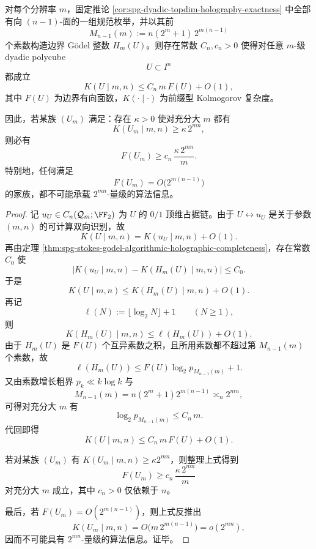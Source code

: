\begin{theorem}\label{thm:conclusion-boundary-kolmogorov-incompressibility-forces-roughness}
对每个分辨率 \(m\)，固定推论 \ref{cor:spg-dyadic-topdim-holography-exactness} 中全部有向 \((n-1)\)-面的一组规范枚举，并以其前
\[
M_{n-1}(m):=n(2^m+1)\,2^{m(n-1)}
\]
个素数构造边界 Gödel 整数 \(H_m(U)\)。则存在常数 \(C_n,c_n>0\) 使得对任意 \(m\)-级 dyadic polycube
\[
U\subset I^n
\]
都成立
\[
K(U\mid m,n)\le C_n\,m\,F(U)+O(1),
\]
其中 \(F(U)\) 为边界有向面数，\(K(\cdot\mid\cdot)\) 为前缀型 Kolmogorov 复杂度。

因此，若某族 \((U_m)\) 满足：存在 \(\kappa>0\) 使对充分大 \(m\) 都有
\[
K(U_m\mid m,n)\ge \kappa\,2^{mn},
\]
则必有
\[
F(U_m)\ge c_n\,\frac{\kappa\,2^{mn}}{m}.
\]
特别地，任何满足
\[
F(U_m)=O\!\bigl(2^{m(n-1)}\bigr)
\]
的家族，都不可能承载 \(2^{mn}\)-量级的算法信息。
\end{theorem}
\begin{proof}
记 \(u_U\in C_n(\mathcal Q_m;\FF_2)\) 为 \(U\) 的 \(0/1\) 顶维占据链。由于 \(U\leftrightarrow u_U\) 是关于参数 \((m,n)\) 的可计算双向识别，故
\[
K(U\mid m,n)=K(u_U\mid m,n)+O(1).
\]
再由定理 \ref{thm:spg-stokes-godel-algorithmic-holographic-completeness}，存在常数 \(C_0\) 使
\[
\bigl|K(u_U\mid m,n)-K(H_m(U)\mid m,n)\bigr|\le C_0.
\]
于是
\[
K(U\mid m,n)\le K(H_m(U)\mid m,n)+O(1).
\]
再记
\[
\ell(N):=\lfloor \log_2 N\rfloor+1
\qquad(N\ge 1),
\]
则
\[
K(H_m(U)\mid m,n)\le \ell(H_m(U))+O(1).
\]
由于 \(H_m(U)\) 是 \(F(U)\) 个互异素数之积，且所用素数都不超过第 \(M_{n-1}(m)\) 个素数，故
\[
\ell(H_m(U))
\le
F(U)\log_2 p_{M_{n-1}(m)}+1.
\]
又由素数增长粗界 \(p_k\ll k\log k\) 与
\[
M_{n-1}(m)=n(2^m+1)2^{m(n-1)}\asymp_n 2^{mn},
\]
可得对充分大 \(m\) 有
\[
\log_2 p_{M_{n-1}(m)}\le C_n\,m.
\]
代回即得
\[
K(U\mid m,n)\le C_n\,m\,F(U)+O(1).
\]

若对某族 \((U_m)\) 有 \(K(U_m\mid m,n)\ge \kappa 2^{mn}\)，则整理上式得到
\[
F(U_m)\ge c_n\,\frac{\kappa\,2^{mn}}{m}
\]
对充分大 \(m\) 成立，其中 \(c_n>0\) 仅依赖于 \(n\)。

最后，若 \(F(U_m)=O(2^{m(n-1)})\)，则上式反推出
\[
K(U_m\mid m,n)=O\!\bigl(m\,2^{m(n-1)}\bigr)=o(2^{mn}),
\]
因而不可能具有 \(2^{mn}\)-量级的算法信息。证毕。
\end{proof}

